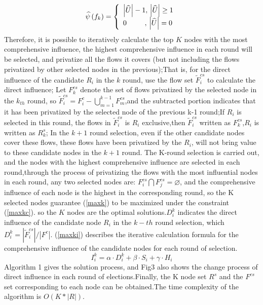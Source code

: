 \documentclass[conference]{IEEEtran}
\begin{document}
\begin{equation}
\widehat{\psi} \left( {{f_k}} \right) = \left\{ \begin{array}{l}
\left| \widehat{U} \right| - 1,{\rm{    }}\left| \widehat{U} \right| \ge 1\\
{\rm{   }}0\quad \quad \; \; ,\, \left| \widehat{U} \right| = 0
\end{array} \right.
\label{maxkr}
\end{equation}
Therefore, it is possible to iteratively calculate the top $K$ nodes with the most comprehensive influence, the highest comprehensive influence in each round will be selected, and privatize all the flows it covers (but not including the flows privatized by other selected nodes in the previous);That is, for the direct influence of the candidate $R_i$ in the $k$ round, use the flow set $\widetilde{F}^{cs}_i$ to calculate the direct influence; Let $F_k^{cs}$ denote the set of flows privatized by the selected node in the $k_{th}$ round, so $\widetilde{F}^{cs}_i = F_i^c- \bigcup_{m=1}^{k-1}F_m^{cs}$,and the subtracted portion indicates that it has been privatized by the selected node of the previous k-1 round;If $R_i$ is selected in this round, the flows in $\widetilde{F}^{cs}_i$ is $R_i$ exclusive,then $\widetilde{F}^{cs}_i$ written as $F^{cs}_k$,$R_i$ is written as $R^s_k$; In the $k+1$ round selection, even if the other candidate nodes cover these flows, these flows have been privatized by the $R_i$, will not bring value to these candidate nodes in the $k+1$ round. The K-round selection is carried out, and the nodes with the highest comprehensive influence are selected in each round,through the process of privatizing the flows with the most influential nodes in each round, any two selected nodes are: $F^{cs}_i \bigcap F^{cs}_j = \varnothing$, and the comprehensive influence of each node is the highest in the corresponding round, so the K selected nodes guarantee (\ref{maxk}) to be maximized under the constraint (\ref{maxkc}). so the $K$ nodes are the optimal solutions.$D_i^k$ indicates the direct influence of the candidate node $R_i$ in the $k-th$ round selection, which $D_i^k = |\widetilde{F}^{cs}_i|/{\left| F^c \right|}$. (\ref{maxki}) describes the iterative calculation formula for the comprehensive influence of the candidate nodes for each round of selection.
\begin{equation}
I_{i}^{k}=\alpha \cdot D_{i}^{k}+\beta \cdot {{S}_{i}}+\gamma \cdot {{H}_{i}}
\label{maxki}
\end{equation}
Algorithm 1 gives the solution process, and Fig3 also shows the change process of direct influence in each round of elections.Finally, the K node set $R^s$ and the $F^{cs}$ set corresponding to each node can be obtained.The time complexity of the algorithm is $O(K*|R|)$.
\end{document}
